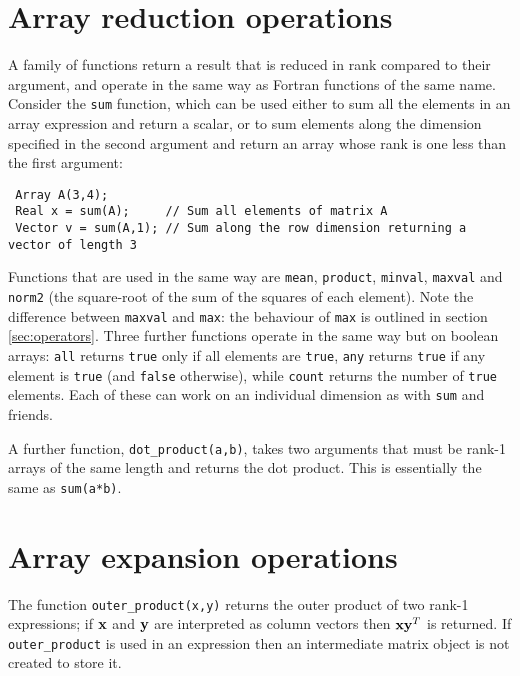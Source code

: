\documentclass[a4,oneside]{book}
\def\codesize{\small}
\def\code#1{{\codesize\texttt{#1}}}
\begin{document}
\section{Array reduction operations}
\label{sec:reduce}
A family of functions return a result that is reduced in rank compared
to their argument, and operate in the same way as Fortran functions of
the same name.  Consider the \code{sum} function, which can be used
either to sum all the elements in an array expression and return a
scalar, or to sum elements along the dimension specified in the second
argument and return an array whose rank is one less than the first
argument:
\begin{lstlisting}
 Array A(3,4);
 Real x = sum(A);     // Sum all elements of matrix A
 Vector v = sum(A,1); // Sum along the row dimension returning a vector of length 3
\end{lstlisting}
Functions that are used in the same way are \code{mean},
\code{product}, \code{minval}, \code{maxval} and \code{norm2} (the
square-root of the sum of the squares of each element).  Note the
difference between \code{maxval} and \code{max}: the behaviour of
\code{max} is outlined in section \ref{sec:operators}. Three further
functions operate in the same way but on boolean arrays: \code{all}
returns \code{true} only if all elements are \code{true}, \code{any}
returns \code{true} if any element is \code{true} (and \code{false}
otherwise), while \code{count} returns the number of \code{true}
elements.  Each of these can work on an individual dimension as with
\code{sum} and friends.

A further function, \code{dot\_product(a,b)}, takes two arguments that
must be rank-1 arrays of the same length and returns the dot
product. This is essentially the same as \code{sum(a*b)}.

\section{Array expansion operations}
\label{sec:expand}
The function \code{outer\_product(x,y)} returns the outer product of
two rank-1 expressions; if ${\bf x}$ and ${\bf y}$ are interpreted as
column vectors then ${\bf xy}^T$ is returned. If \code{outer\_product}
is used in an expression then an intermediate matrix object is not
created to store it.
\end{document}
